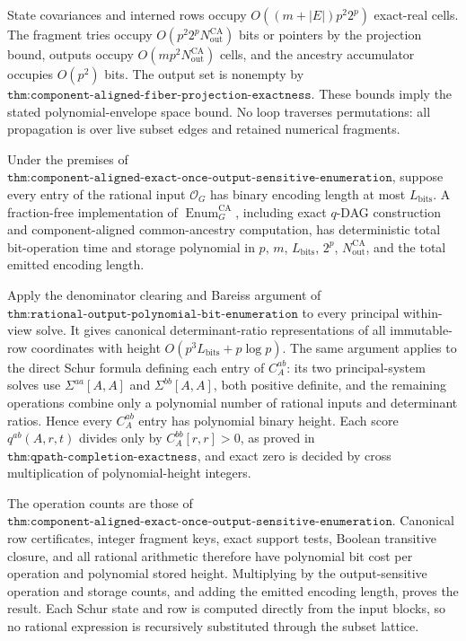 State covariances and interned rows occupy \(O((m+|E|)p^2 2^p)\) exact-real cells.  The fragment tries occupy \(O(p^2 2^pN_{\mathrm{out}}^{\mathrm{CA}})\) bits or pointers by the projection bound, outputs occupy \(O(mp^2N_{\mathrm{out}}^{\mathrm{CA}})\) cells, and the ancestry accumulator occupies \(O(p^2)\) bits.  The output set is nonempty by \(\texttt{thm:component-aligned-fiber-projection-exactness}\).  These bounds imply the stated polynomial-envelope space bound.  No loop traverses permutations: all propagation is over live subset edges and retained numerical fragments.

Under the premises of \(\texttt{thm:component-aligned-exact-once-output-sensitive-enumeration}\), suppose every entry of the rational input \(\mathcal O_G\) has binary encoding length at most \(L_{\mathrm{bits}}\).  A fraction-free implementation of \(\operatorname{Enum}_G^{\mathrm{CA}}\), including exact \(q\)-DAG construction and component-aligned common-ancestry computation, has deterministic total bit-operation time and storage polynomial in \(p\), \(m\), \(L_{\mathrm{bits}}\), \(2^p\), \(N_{\mathrm{out}}^{\mathrm{CA}}\), and the total emitted encoding length.

Apply the denominator clearing and Bareiss argument of \(\texttt{thm:rational-output-polynomial-bit-enumeration}\) to every principal within-view solve.  It gives canonical determinant-ratio representations of all immutable-row coordinates with height \(O(p^3L_{\mathrm{bits}}+p\log p)\).  The same argument applies to the direct Schur formula defining each entry of \(C_A^{ab}\): its two principal-system solves use \(\Sigma^{aa}[A,A]\) and \(\Sigma^{bb}[A,A]\), both positive definite, and the remaining operations combine only a polynomial number of rational inputs and determinant ratios.  Hence every \(C_A^{ab}\) entry has polynomial binary height.  Each score \(q^{ab}(A,r,t)\) divides only by \(C_A^{bb}[r,r]>0\), as proved in \(\texttt{thm:qpath-completion-exactness}\), and exact zero is decided by cross multiplication of polynomial-height integers.

The operation counts are those of \(\texttt{thm:component-aligned-exact-once-output-sensitive-enumeration}\).  Canonical row certificates, integer fragment keys, exact support tests, Boolean transitive closure, and all rational arithmetic therefore have polynomial bit cost per operation and polynomial stored height.  Multiplying by the output-sensitive operation and storage counts, and adding the emitted encoding length, proves the result.  Each Schur state and row is computed directly from the input blocks, so no rational expression is recursively substituted through the subset lattice.
